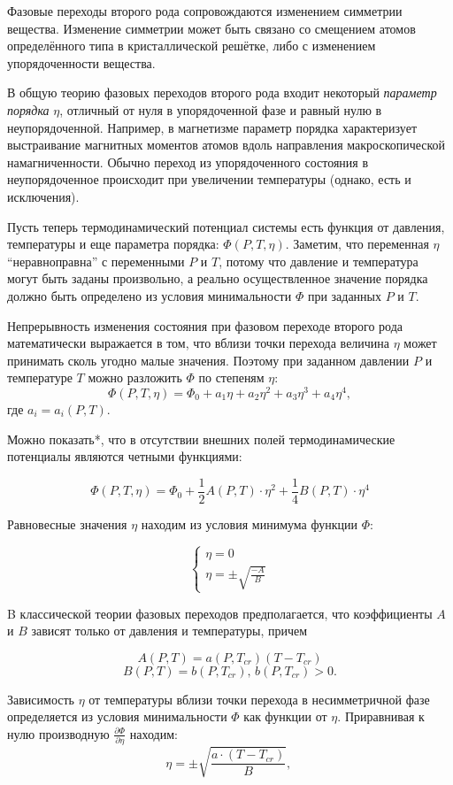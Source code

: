 \documentclass[a4paper, 12pt]{article}
\begin{document}
Фазовые переходы второго рода сопровождаются изменением симметрии вещества. Изменение симметрии может быть связано со смещением атомов определённого типа в кристаллической решётке, либо с изменением упорядоченности вещества.

В общую теорию фазовых переходов второго рода входит некоторый \emph{параметр порядка} $\eta$, отличный от нуля в упорядоченной фазе и равный нулю в неупорядоченной. Например, в магнетизме параметр порядка характеризует выстраивание магнитных моментов атомов вдоль направления макроскопической намагниченности. Обычно переход из упорядоченного состояния в неупорядоченное происходит при увеличении температуры (однако, есть и исключения). 

Пусть теперь термодинамический потенциал системы есть функция от давления, температуры и еще параметра порядка: $\Phi(P, T, \eta)$. Заметим, что переменная $\eta$  ``неравноправна'' с переменными $P$ и $T$, потому что давление и температура могут быть заданы произвольно, а реально осуществленное значение порядка должно быть определено из условия минимальности $\Phi$ при заданных $P$ и $T$.

Непрерывность изменения состояния при фазовом переходе второго рода математически выражается в том, что вблизи точки перехода величина $\eta$ может принимать сколь угодно малые значения. Поэтому при заданном давлении $P$ и температуре $T$ можно разложить $\Phi$ по степеням $\eta$:
$$ 
	\Phi(P, T, \eta) = \Phi_0 + a_1 \eta + a_2 \eta^2 + a_3 \eta^3 + a_4 \eta^4,
$$
где $a_i = a_i(P, T)$.

Можно показать*, что в отсутствии внешних полей термодинамические потенциалы являются четными функциями:

$$
	\Phi(P, T, \eta) = \Phi_0 + \frac{1}{2} A(P, T) \cdot \eta^2 + \frac{1}{4} B(P, T) \cdot \eta^4
$$

Равновесные значения $\eta$ находим из условия минимума функции $\Phi$:

$$
\begin{cases}
	\eta = 0 \\
	\eta = \pm \sqrt{\frac{-A}{B}}
\end{cases}
$$

B классической теории фазовых переходов предполагается, что коэффициенты $A$ и $B$ зависят только от давления и температуры, причем 

$$
A(P, T) = a(P, T_{cr}) (T - T_{cr}) 
$$
$$
B(P, T) = b(P, T_{cr}) \text{, } b(P, T_{cr}) > 0.
$$

Зависимость $\eta$ от температуры вблизи точки перехода в несимметричной фазе определяется из условия минимальности $\Phi$ как функции от $\eta$. Приравнивая к нулю производную $\frac{\partial \Phi}{\partial \eta}$ находим: 
$$
	\eta = \pm \sqrt{ \frac{a \cdot (T - T_{cr})}{B} } \text{, }
$$
\end{document}
